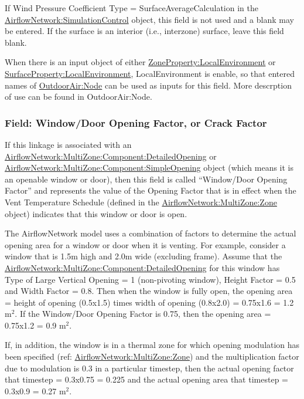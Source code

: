 If Wind Pressure Coefficient Type = SurfaceAverageCalculation in the \hyperref[airflownetworksimulationcontrol]{AirflowNetwork:\hyperref[simulationcontrol]{SimulationControl}}
object, this field is not used and a blank may be entered. If the surface is an
interior (i.e., interzone) surface, leave this field blank.

When there is an input object of either \hyperref[zonepropertylocalenvironment]{ZoneProperty:LocalEnvironment} or \hyperref[surfacepropertylocalenvironment]{SurfaceProperty:LocalEnvironment}, LocalEnvironment is enable, so that entered names of \hyperref[outdoorairnode]{OutdoorAir:Node} can be used as inputs for this field. More descrption of use can be found in  OutdoorAir:Node.

\subsubsection{Field: Window/Door Opening Factor, or Crack Factor}\label{field-windowdoor-opening-factor-or-crack-factor}

If this linkage is associated with an \hyperref[airflownetworkmultizonecomponentdetailedopening]{AirflowNetwork:MultiZone:Component:DetailedOpening} or \hyperref[airflownetworkmultizonecomponentsimpleopening]{AirflowNetwork:MultiZone:Component:SimpleOpening} object (which means it is an openable window or door), then this field is called ``Window/Door Opening Factor'' and represents the value of the Opening Factor that is in effect when the Vent Temperature Schedule (defined in the \hyperref[airflownetworkmultizonezone]{AirflowNetwork:MultiZone:Zone} object) indicates that this window or door is open.

The AirflowNetwork model uses a combination of factors to determine the actual opening area for a window or door when it is venting. For example, consider a window that is 1.5m high and 2.0m wide (excluding frame). Assume that the \hyperref[airflownetworkmultizonecomponentdetailedopening]{AirflowNetwork:MultiZone:Component:DetailedOpening} for this window has Type of Large Vertical Opening = 1 (non-pivoting window), Height Factor = 0.5 and Width Factor = 0.8. Then when the window is fully open, the opening area = height of opening (0.5x1.5) times width of opening (0.8x2.0) = 0.75x1.6 = 1.2 m\(^{2}\). If the Window/Door Opening Factor is 0.75, then the opening area = 0.75x1.2 = 0.9 m\(^{2}\).

If, in addition, the window is in a thermal zone for which opening modulation has been specified (ref: \hyperref[airflownetworkmultizonezone]{AirflowNetwork:MultiZone:Zone}) and the multiplication factor due to modulation is 0.3 in a particular timestep, then the actual opening factor that timestep = 0.3x0.75 = 0.225 and the actual opening area that timestep = 0.3x0.9 = 0.27 m\(^{2}\).

